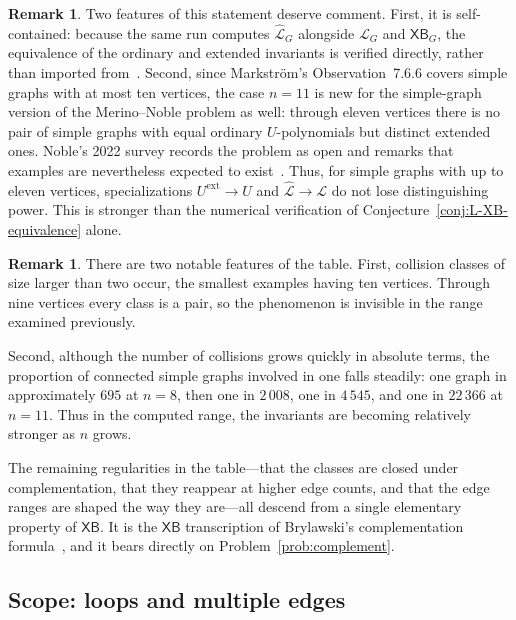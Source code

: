 \documentclass[11pt]{article}
\theoremstyle{plain}
\theoremstyle{definition}
\newtheorem{remark}[theorem]{Remark}
\renewcommand{\mathcal}{\mathscr}
\newcommand{\LL}{\mathcal{L}}    %
\newcommand{\XB}{\mathsf{XB}} %
\newcommand{\ext}{\mathrm{ext}}
\numberwithin{equation}{section}
\begin{document}
\begin{remark}\label{rem:markstrom-extended}
Two features of this statement deserve comment.  First, it is self-contained:
because the same run computes $\widehat{\LL}_G$ alongside $\LL_G$ and $\XB_G$,
the equivalence of the ordinary and extended invariants is verified directly,
rather than imported from~\cite{Mar}.  Second, since Markstr\"om's
Observation~7.6.6 covers simple graphs with at most ten vertices, the case
$n=11$ is new for the simple-graph version of the Merino--Noble problem as well:
through eleven vertices there is no pair of simple graphs with
equal ordinary $U$-polynomials but distinct extended ones.  Noble's 2022 survey
records the problem as open and remarks that examples are
nevertheless expected to exist~\cite[\S26.7]{Nob}.  Thus, for simple graphs
with up to eleven vertices, specializations $U^{\ext}\to U$ and
$\widehat{\LL}\to\LL$ do not lose distinguishing power.  This is stronger than
the numerical verification of Conjecture~\ref{conj:L-XB-equivalence} alone.
\end{remark}

\begin{remark}\label{rem:table-structure}
There are two notable features of the table. First, collision classes of size larger than two occur,
the smallest examples having ten vertices.  Through nine vertices every class is a pair,
so the phenomenon is invisible in the range examined previously.

Second, although the number of collisions grows quickly in absolute terms,
the proportion of connected simple graphs involved in one falls steadily:
one graph in approximately $695$ at $n=8$, then one in $2\,008$, one in $4\,545$,
and one in $22\,366$ at $n=11$.
Thus in the computed range, the invariants are becoming relatively stronger as $n$ grows.
\end{remark}

The remaining regularities in the table---that the classes are closed under complementation,
that they reappear at higher edge counts, and that the edge ranges are shaped
the way they are---all descend from a single elementary property of $\XB$.
It is the $\XB$ transcription of Brylawski's complementation formula~\cite[Proposition~4.3]{Bry},
and it bears directly on Problem~\ref{prob:complement}.

\subsection{Scope: loops and multiple edges}
\label{sec:why-loops}
\end{document}
